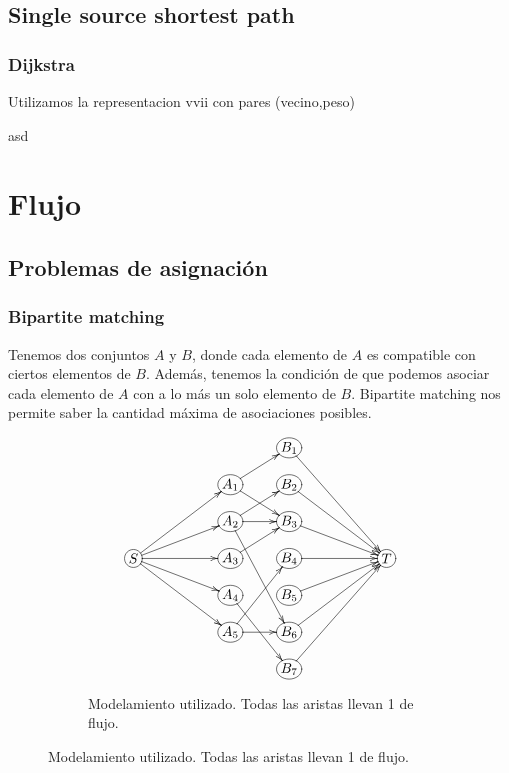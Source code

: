\documentclass[oneside]{book}
\begin{document}
	\section{Single source shortest path}
	\subsection{Dijkstra}
	Utilizamos la representacion vvii con pares (vecino,peso)
	\begin{codigo}
	asd
	\end{codigo}
	\chapter{Flujo}
	\section{Problemas de asignaci\'on}
	\subsection{Bipartite matching}
	Tenemos dos conjuntos $A$ y $B$, donde cada elemento de $A$ es compatible con ciertos elementos de $B$. Adem\'as, tenemos la condici\'on de que podemos asociar cada elemento de $A$ con a lo m\'as un solo elemento de $B$. Bipartite matching nos permite saber la cantidad m\'axima de asociaciones posibles.
\begin{figure}[h]
\centering
\begin{subfigure}{.5\textwidth}
\begin{displaymath}
\xymatrix@R-1pc{
&&&*+[o][F-]{B_1} \ar[dddrr]
\\
&&*+[o][F-]{A_1} \ar[ur] \ar[dr]
&*+[o][F-]{B_2} \ar[ddrr]
\\
&&*+[o][F-]{A_2} \ar[r] \ar[dddr] \ar[ur]
&*+[o][F-]{B_3} \ar[drr]
\\
*+[o][F-]{S} \ar[rruu] \ar[rru] \ar[rr] \ar[rrd] \ar[rrdd]
&&*+[o][F-]{A_3} \ar[ur]
&*+[o][F-]{B_4} \ar[rr]
&&*+[o][F-]{T}
\\
&&*+[o][F-]{A_4} \ar[ddr]
&*+[o][F-]{B_5} \ar[urr]
\\
&&*+[o][F-]{A_5} \ar[r] \ar[uur]
&*+[o][F-]{B_6} \ar[uurr]
\\
&&&*+[o][F-]{B_7} \ar[uuurr]
\\
}
\end{displaymath}
\caption*{Modelamiento utilizado. Todas las aristas llevan 1 de flujo.}
\end{subfigure}
\end{figure}
	
\end{document}
